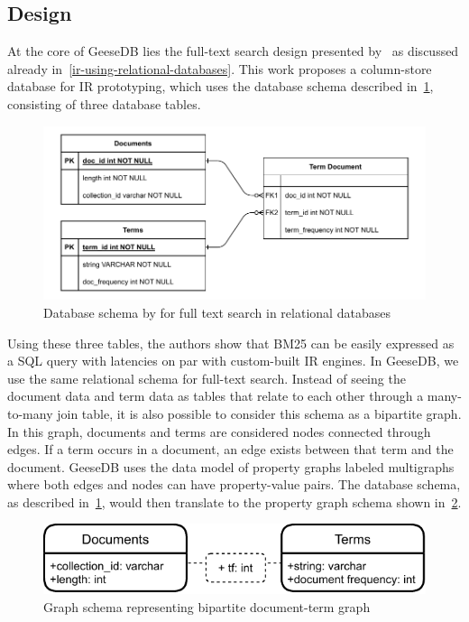 \subsection{Design}
At the core of GeeseDB lies the full-text search design presented by~\citet{OldDog} as discussed already in~\cref{ir-using-relational-databases}. This work proposes a column-store database for IR prototyping, which uses the database schema described in~\cref{olddog_schema}, consisting of three database tables.
\begin{figure}
	\centering
	\includegraphics[width=\linewidth]{./imgs/olddog-schema-3.pdf}
	\caption{Database schema by \citeauthor{OldDog} for full text search in relational databases}
	\label{olddog_schema}
\end{figure}
Using these three tables, the authors show that BM25 can be easily expressed as a SQL query with latencies on par with custom-built IR engines. In GeeseDB, we use the same relational schema for full-text search.
Instead of seeing the document data and term data as tables that relate to each other through a many-to-many join table, it is also possible to consider this schema as a bipartite graph. In this graph, documents and terms are considered nodes connected through edges. If a term occurs in a document, an edge exists between that term and the document. GeeseDB uses the data model of property graphs labeled multigraphs where both edges and nodes can have property-value pairs. The database schema, as described in~\cref{olddog_schema}, would then translate to the property graph schema shown in~\cref{olddog-graph-schema}.
\begin{figure}
	\centering
	\includegraphics[width=\linewidth]{./imgs/olddog-graph-schema.pdf}
	\caption{Graph schema representing bipartite document-term graph}
	\label{olddog-graph-schema}
\end{figure}
